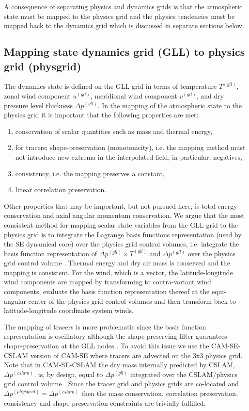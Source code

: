 A consequence of separating physics and dynamics grids is that the atmospheric state must be mapped to the physics grid and the physics tendencies must be mapped back to the dynamics grid which is discussed in separate sections below. 
\subsection{Mapping state dynamics grid (GLL) to physics grid (physgrid)}
The dynamics state is defined on the GLL grid in terms of temperature $T^{(gll)}$, zonal wind component $u^{(gll)}$, meridional wind component $v^{(gll)}$, and dry pressure level thickness $\Delta p^{(gll)}$. In the mapping of the atmospheric state to the physics grid it is important that the following properties are met:
\begin{enumerate}
\item conservation of scalar quantities such as mass and thermal energy,\label{prop1}
\item for tracers; shape-preservation (monotonicity), i.e. the mapping method must not introduce new extrema in the interpolated field, in particular, negatives,\label{prop2}
\item consistency, i.e. the mapping preserves a constant,\label{prop3}
\item linear correlation preservation.
\end{enumerate}
Other properties that may be important, but not pursued here, is total energy conservation and axial angular momentum conservation. We argue that the most consistent method for mapping scalar state variables from the GLL grid to the physics grid is to integrate the Lagrange basis functions representation (used by the SE dynamical core) over the physics grid control volumes, i.e. integrate the basis function representation of $\Delta p^{(gll)}\times T^{(gll)}$ and $\Delta p^{(gll)}$ over the physics grid control volume \citep[see, e.g., ][]{LTOUNGK2017MWR}{\color{red}{add Appendix with details}}. Thermal energy and dry air mass is conserved and the mapping is consistent. For the wind, which is a vector, the latitude-longitude wind components are mapped by transforming to contra-variant wind components, evaluate the basis function representation thereof at the equi-angular center of the physics grid control volumes and then transform back to latitude-longitude coordinate system winds. 

The mapping of tracers is more problematic since the basis function representation is oscillatory although the shape-preserving filter guarantees shape-preservation at the GLL nodes \citep{GTS2014JCP}. To avoid this issue we use the CAM-SE-CSLAM version of CAM-SE where tracers are advected on the 3x3 physics grid. Note that in CAM-SE-CSLAM the dry mass internally predicted by CSLAM, $\Delta p^{(cslam)}$, is, by design, equal to $\Delta p^{(gll)}$ integrated over the CSLAM/physics grid control volume \citep{LTOUNGK2017MWR}. Since the tracer grid and physics grids are co-located and $\Delta p^{(physgrid)}=\Delta p^{(cslam)}$ then the  mass conservation, correlation preservation, consistency and shape-preservation constraints are trivially fulfilled.

